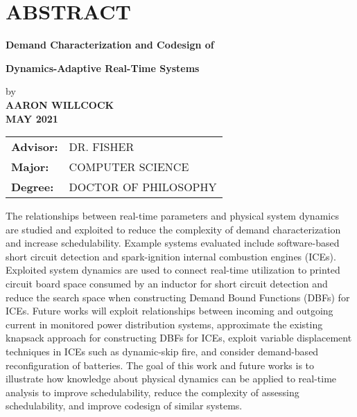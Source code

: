\section*{ABSTRACT}

\centerline{\bf Demand Characterization and Codesign of }
\vspace{-0.4cm}
\centerline{\bf Dynamics-Adaptive Real-Time Systems}

{\setlength\baselineskip{0.3in}
\begin{center}
by\\
\medskip
{\bf AARON WILLCOCK}\\
\medskip
{\bf MAY 2021}\\
\end{center}
\Vspc
\begin{tabular}{ll}
	{\bf Advisor:} & DR. FISHER \\
	{\bf Major:} & COMPUTER SCIENCE \\
	{\bf Degree:} & DOCTOR OF PHILOSOPHY
\end{tabular}
}

\bigskip \bigskip

The relationships between real-time parameters and physical system dynamics are studied and exploited to reduce the complexity of demand characterization and increase schedulability.
Example systems evaluated include software-based short circuit detection and spark-ignition internal combustion engines (ICEs).
Exploited system dynamics are used to connect real-time utilization to printed circuit board space consumed by an inductor for short circuit detection and reduce the search space when constructing Demand Bound Functions (DBFs) for ICEs.
Future works will exploit relationships between incoming and outgoing current in monitored power distribution systems, approximate the existing knapsack approach for constructing DBFs for ICEs, exploit variable displacement techniques in ICEs such as dynamic-skip fire, and consider demand-based reconfiguration of batteries.
The goal of this work and future works is to illustrate how knowledge about physical dynamics can be applied to real-time analysis to improve schedulability, reduce the complexity of assessing schedulability, and improve codesign of similar systems.